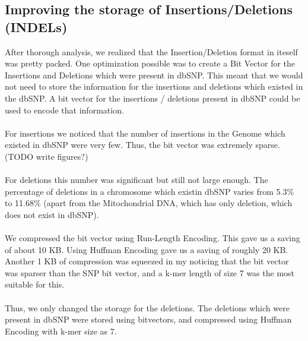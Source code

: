 \documentclass{article}
\begin{document}
\subsection {Improving the storage of Insertions/Deletions (INDELs)}
After thorough analysis, we realized that the Insertion/Deletion format in iteself was pretty packed. One optimization possible was to create a Bit Vector for the Insertions and Deletions which were present in dbSNP. This meant that we would not need to store the information for the insertions and deletions which existed in the dbSNP. A bit vector for the insertions / deletions present in dbSNP could be used to encode that information.\\ 
\\
For insertions we noticed that the number of insertions in the Genome which existed in dbSNP were very few. Thus, the bit vector was extremely sparse. (TODO write figures?) \\
\\
For deletions this number was significant but still not large enough. The percentage of deletions in a chromosome which existin dbSNP varies from 5.3\% to 11.68\% (apart from the Mitochondrial DNA, which has only deletion, which does not exist in dbSNP).\\
\\
We compressed the bit vector using Run-Length Encoding. This gave us a saving of about 10 KB. Using Huffman Encoding gave us a saving of roughly 20 KB. Another 1 KB of compression was squeezed in my noticing that the bit vector was sparser than the SNP bit vector, and a k-mer length of size 7 was the most suitable for this.\\ 
\\
Thus, we only changed the storage for the deletions. The deletions which were present in dbSNP were stored using bitvectors, and compressed using Huffman Encoding with k-mer size as 7.
\end{document}
